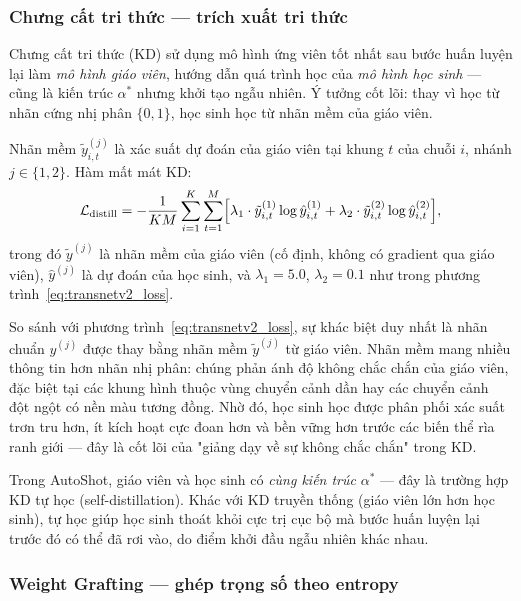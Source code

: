 \subsubsection{Chưng cất tri thức — trích xuất tri thức}
\label{subsubsec:kd}

Chưng cất tri thức (KD) \cite{hinton2015distilling} sử dụng mô hình ứng viên tốt nhất sau bước huấn luyện lại làm \textit{mô hình giáo viên}, hướng dẫn quá trình học của \textit{mô hình học sinh} — cũng là kiến trúc $\alpha^*$ nhưng khởi tạo ngẫu nhiên. Ý tưởng cốt lõi: thay vì học từ nhãn cứng nhị phân $\{0, 1\}$, học sinh học từ nhãn mềm của giáo viên.

Nhãn mềm $\tilde{y}^{(j)}_{i,t}$ là xác suất dự đoán của giáo viên tại khung $t$ của chuỗi $i$, nhánh $j \in \{1, 2\}$. Hàm mất mát KD:
\begin{equation}
    \mathcal{L}_{\mathrm{distill}}
    = -\frac{1}{KM} \sum_{i=1}^{K} \sum_{t=1}^{M}
      \Bigl[
        \lambda_1 \cdot \tilde{y}^{(1)}_{i,t} \log \hat{y}^{(1)}_{i,t}
        + \lambda_2 \cdot \tilde{y}^{(2)}_{i,t} \log \hat{y}^{(2)}_{i,t}
      \Bigr],
    \label{eq:kd_loss}
\end{equation}
trong đó $\tilde{y}^{(j)}$ là nhãn mềm của giáo viên (cố định, không có gradient qua giáo viên), $\hat{y}^{(j)}$ là dự đoán của học sinh, và $\lambda_1 = 5.0$, $\lambda_2 = 0.1$ như trong phương trình~\eqref{eq:transnetv2_loss}.

So sánh với phương trình~\eqref{eq:transnetv2_loss}, sự khác biệt duy nhất là nhãn chuẩn $y^{(j)}$ được thay bằng nhãn mềm $\tilde{y}^{(j)}$ từ giáo viên. Nhãn mềm mang nhiều thông tin hơn nhãn nhị phân: chúng phản ánh độ không chắc chắn của giáo viên, đặc biệt tại các khung hình thuộc vùng chuyển cảnh dần hay các chuyển cảnh đột ngột có nền màu tương đồng. Nhờ đó, học sinh học được phân phối xác suất trơn tru hơn, ít kích hoạt cực đoan hơn và bền vững hơn trước các biến thể rìa ranh giới — đây là cốt lõi của "giảng dạy về sự không chắc chắn" trong KD.

Trong AutoShot, giáo viên và học sinh có \textit{cùng kiến trúc} $\alpha^*$ — đây là trường hợp KD tự học (self-distillation). Khác với KD truyền thống (giáo viên lớn hơn học sinh), tự học giúp học sinh thoát khỏi cực trị cục bộ mà bước huấn luyện lại trước đó có thể đã rơi vào, do điểm khởi đầu ngẫu nhiên khác nhau.

\subsubsection{Weight Grafting — ghép trọng số theo entropy}
\label{subsubsec:grafting}

